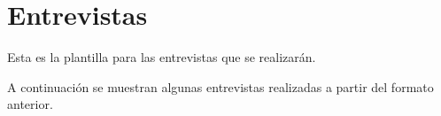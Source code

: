 \chapter{Entrevistas}
\label{cap:Entrevistas}

Esta es la plantilla para las entrevistas que se realizarán.



A continuación se muestran algunas entrevistas realizadas a partir del formato anterior.



